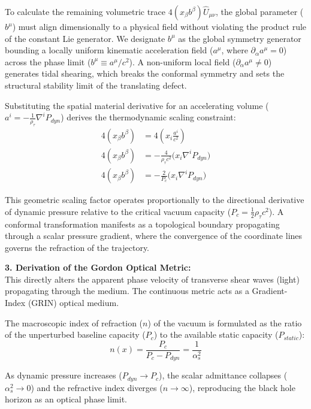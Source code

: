 To calculate the remaining volumetric trace $4(x_\beta b^\beta)\hat{U}_{\mu\nu}$, the global parameter ($b^\mu$) must align dimensionally to a physical field without violating the product rule of the constant Lie generator. We designate $b^\mu$ as the global symmetry generator bounding a locally uniform kinematic acceleration field ($a^\mu$, where $\partial_\alpha a^\mu = 0$) across the phase limit ($b^\mu \equiv a^\mu / c^2$). A non-uniform local field ($\partial_\alpha a^\mu \neq 0$) generates tidal shearing, which breaks the conformal symmetry and sets the structural stability limit of the translating defect.

Substituting the spatial material derivative for an accelerating volume ($a^i = - \frac{1}{\rho_\tau} \nabla^i P_{dyn}$) derives the thermodynamic scaling constraint:
\begin{align}
    4(x_\beta b^\beta) &= 4 \left( x_i \frac{a^i}{c^2} \right) \nonumber \\
    4(x_\beta b^\beta) &= -\frac{4}{\rho_\tau c^2} \big( x_i \nabla^i P_{dyn} \big) \nonumber \\
    4(x_\beta b^\beta) &= -\frac{2}{P_c} \big( x_i \nabla^i P_{dyn} \big) \label{eq:conformal_pressure_coupling}
\end{align}

This geometric scaling factor operates proportionally to the directional derivative of dynamic pressure relative to the critical vacuum capacity ($P_c = \frac{1}{2}\rho_\tau c^2$). A conformal transformation manifests as a topological boundary propagating through a scalar pressure gradient, where the convergence of the coordinate lines governs the refraction of the trajectory.

\vspace{0.2 cm}

\textbf{3. Derivation of the Gordon Optical Metric:} \\
This directly alters the apparent phase velocity of transverse shear waves (light) propagating through the medium. The continuous metric acts as a Gradient-Index (GRIN) optical medium.

The macroscopic index of refraction ($n$) of the vacuum is formulated as the ratio of the unperturbed baseline capacity ($P_c$) to the available static capacity ($P_{static}$):
\begin{equation}
    n(x) = \frac{P_c}{P_c - P_{dyn}} = \frac{1}{\alpha_s^2} \label{eq:refractive_index}
\end{equation}

As dynamic pressure increases ($P_{dyn} \to P_c$), the scalar admittance collapses ($\alpha_s^2 \to 0$) and the refractive index diverges ($n \to \infty$), reproducing the black hole horizon as an optical phase limit. 


